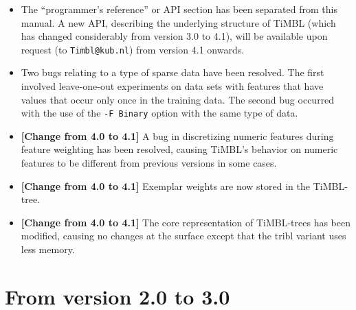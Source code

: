 \documentclass{report}
\begin{document}
\begin{itemize}
\item The ``programmer's reference'' or API section has been separated
from this manual. A new API, describing the underlying structure of
TiMBL (which has changed considerably from version 3.0 to 4.1), will
be available upon request (to {\tt Timbl@kub.nl}) from version 4.1
onwards.

\item Two bugs relating to a type of sparse data have been
resolved. The first involved leave-one-out experiments on data sets
with features that have values that occur only once in the training
data. The second bug occurred with the use of the {\tt -F Binary}
option with the same type of data.

\item {\bf [Change from 4.0 to 4.1]} A bug in discretizing numeric
features during feature weighting has been resolved, causing TiMBL's
behavior on numeric features to be different from previous versions in
some cases.

\item {\bf [Change from 4.0 to 4.1]} Exemplar weights are now stored
in the TiMBL-tree.

\item {\bf [Change from 4.0 to 4.1]} The core representation of
TiMBL-trees has been modified, causing no changes at the surface
except that the {\sc tribl} variant uses less memory.

\end{itemize}

\section{From version 2.0 to 3.0}
\end{document}
